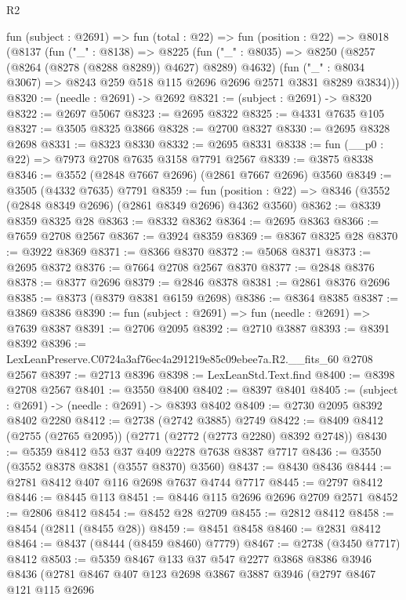 \begin{lexlean}{R2}
\begin{coremodule}
  fun (subject : @2691) =>
  fun (total : @22) =>
  fun (position : @22) =>
  @8018
    (@8137
      (fun ("_" : @8138) =>
      @8225
        (fun ("_" : @8035) => @8250 (@8257 (@8264 (@8278 (@8288 @8289)) @4627) @8289) @4632)
        (fun ("_" : @8034 @3067) => @8243 @259 @518 @115 @2696 @2696 @2571 @3831 @8289 @3834)))
@8320 := (needle : @2691) -> @2692
@8321 := (subject : @2691) -> @8320
@8322 := @2697 @5067
@8323 := @2695 @8322
@8325 := @4331 @7635 @105
@8327 := @3505 @8325 @3866
@8328 := @2700 @8327
@8330 := @2695 @8328 @2698
@8331 := @8323 @8330
@8332 := @2695 @8331
@8338 := fun (__p0 : @22) => @7973 @2708 @7635 @3158 @7791 @2567
@8339 := @3875 @8338
@8346 := @3552 (@2848 @7667 @2696) (@2861 @7667 @2696) @3560
@8349 := @3505 (@4332 @7635) @7791
@8359 := fun (position : @22) => @8346 (@3552 (@2848 @8349 @2696) (@2861 @8349 @2696) @4362 @3560)
@8362 := @8339 @8359 @8325 @28
@8363 := @8332 @8362
@8364 := @2695 @8363
@8366 := @7659 @2708 @2567
@8367 := @3924 @8359
@8369 := @8367 @8325 @28
@8370 := @3922 @8369
@8371 := @8366 @8370
@8372 := @5068 @8371
@8373 := @2695 @8372
@8376 := @7664 @2708 @2567 @8370
@8377 := @2848 @8376
@8378 := @8377 @2696
@8379 := @2846 @8378
@8381 := @2861 @8376 @2696
@8385 := @8373 (@8379 @8381 @6159 @2698)
@8386 := @8364 @8385
@8387 := @3869 @8386
@8390 := fun (subject : @2691) => fun (needle : @2691) => @7639 @8387
@8391 := @2706 @2095
@8392 := @2710 @3887
@8393 := @8391 @8392
@8396 := LexLeanPreserve.C0724a3af76ec4a291219e85c09ebee7a.R2.__fits_60 @2708 @2567
@8397 := @2713 @8396
@8398 := LexLeanStd.Text.find
@8400 := @8398 @2708 @2567
@8401 := @3550 @8400
@8402 := @8397 @8401
@8405 := (subject : @2691) -> (needle : @2691) -> @8393 @8402
@8409 := @2730 @2095 @8392 @8402 @2280
@8412 := @2738 (@2742 @3885) @2749
@8422 := @8409 @8412 (@2755 (@2765 @2095)) (@2771 (@2772 (@2773 @2280) @8392 @2748))
@8430 := @5359 @8412 @53 @37 @409 @2278 @7638 @8387 @7717
@8436 := @3550 (@3552 @8378 @8381 (@3557 @8370) @3560)
@8437 := @8430 @8436
@8444 := @2781 @8412 @407 @116 @2698 @7637 @4744 @7717
@8445 := @2797 @8412
@8446 := @8445 @113
@8451 := @8446 @115 @2696 @2696 @2709 @2571
@8452 := @2806 @8412
@8454 := @8452 @28 @2709
@8455 := @2812 @8412
@8458 := @8454 (@2811 (@8455 @28))
@8459 := @8451 @8458
@8460 := @2831 @8412
@8464 := @8437 (@8444 (@8459 @8460) @7779)
@8467 := @2738 (@3450 @7717) @8412
@8503 := @5359
    @8467
    @133
    @37
    @547
    @2277
    @3868
    @8386
    @3946
    @8436
    (@2781
      @8467
      @407
      @123
      @2698
      @3867
      @3887
      @3946
      (@2797
        @8467
        @121
        @115
        @2696

\end{coremodule}
\end{lexlean}
